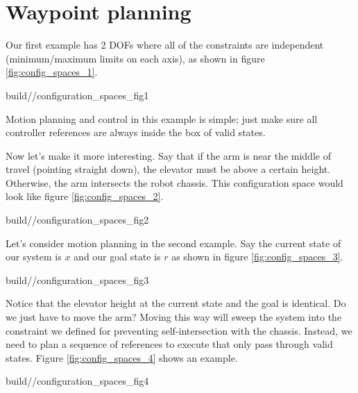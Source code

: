 \section{Waypoint planning}

Our first example has 2 DOFs where all of the constraints are independent
(minimum/maximum limits on each axis), as shown in figure
\ref{fig:config_spaces_1}.
\begin{svg}{build/\partpath/configuration_spaces_fig1}
  \caption{Elevator-arm configuration space with independent constraints}
  \label{fig:config_spaces_1}
\end{svg}

Motion planning and control in this example is simple; just make sure all
controller references are always inside the box of valid states.

Now let's make it more interesting. Say that if the arm is near the middle of
travel (pointing straight down), the elevator must be above a certain height.
Otherwise, the arm intersects the robot chassis. This configuration space would
look like figure \ref{fig:config_spaces_2}.
\begin{svg}{build/\partpath/configuration_spaces_fig2}
  \caption{Elevator-arm configuration space requiring elevator to be above a
    certain height when arm is pointing down}
  \label{fig:config_spaces_2}
\end{svg}

Let's consider motion planning in the second example. Say the current state of
our system is $x$ and our goal state is $r$ as shown in figure
\ref{fig:config_spaces_3}.
\begin{svg}{build/\partpath/configuration_spaces_fig3}
  \caption{Elevator-arm configuration space with initial state $x$ and goal
    state $r$}
  \label{fig:config_spaces_3}
\end{svg}

Notice that the elevator height at the current state and the goal is identical.
Do we just have to move the arm? Moving this way will sweep the system into the
constraint we defined for preventing self-intersection with the chassis.
Instead, we need to plan a sequence of references to execute that only pass
through valid states. Figure \ref{fig:config_spaces_4} shows an example.
\begin{svg}{build/\partpath/configuration_spaces_fig4}
  \caption{Elevator-arm configuration space with path between initial state $x$
    and final state $r$}
  \label{fig:config_spaces_4}
\end{svg}

